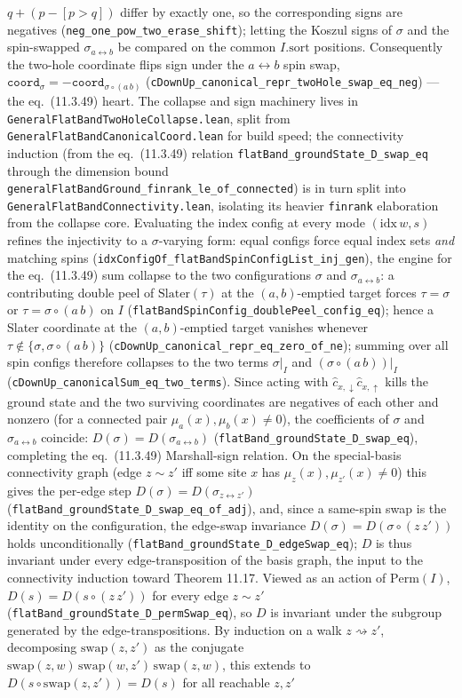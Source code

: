 \documentclass[a4paper,11pt]{article}
\begin{document}
$q+(p-[p>q])$ differ by exactly one, so the corresponding signs are negatives (\texttt{neg\_one\_pow\_two\_erase\_shift}); letting the Koszul signs of $\sigma$ and the spin-swapped $\sigma_{a\leftrightarrow b}$ be compared on the common $I.\mathrm{sort}$ positions.  Consequently the two-hole coordinate flips sign under the $a\leftrightarrow b$ spin swap, $\texttt{coord}_\sigma=-\texttt{coord}_{\sigma\circ(a\,b)}$ (\texttt{cDownUp\_canonical\_repr\_twoHole\_swap\_eq\_neg}) --- the eq.~(11.3.49) heart.  The collapse and sign machinery lives in \texttt{GeneralFlatBandTwoHoleCollapse.lean}, split from \texttt{GeneralFlatBandCanonicalCoord.lean} for build speed; the connectivity induction (from the eq.~(11.3.49) relation \texttt{flatBand\_groundState\_D\_swap\_eq} through the dimension bound \texttt{generalFlatBandGround\_finrank\_le\_of\_connected}) is in turn split into \texttt{GeneralFlatBandConnectivity.lean}, isolating its heavier \texttt{finrank} elaboration from the collapse core.  Evaluating the index config at every mode $(\mathrm{idx}\,w,s)$ refines the injectivity to a $\sigma$-varying form: equal configs force equal index sets \emph{and} matching spins (\texttt{idxConfigOf\_flatBandSpinConfigList\_inj\_gen}), the engine for the eq.~(11.3.49) sum collapse to the two configurations $\sigma$ and $\sigma_{a\leftrightarrow b}$: a contributing double peel of $\mathrm{Slater}(\tau)$ at the $(a,b)$-emptied target forces $\tau=\sigma$ or $\tau=\sigma\circ(a\,b)$ on $I$ (\texttt{flatBandSpinConfig\_doublePeel\_config\_eq}); hence a Slater coordinate at the $(a,b)$-emptied target vanishes whenever $\tau\notin\{\sigma,\sigma\circ(a\,b)\}$ (\texttt{cDownUp\_canonical\_repr\_eq\_zero\_of\_ne}); summing over all spin configs therefore collapses to the two terms $\sigma|_I$ and $(\sigma\circ(a\,b))|_I$ (\texttt{cDownUp\_canonicalSum\_eq\_two\_terms}).  Since acting with $\hat c_{x,\downarrow}\hat c_{x,\uparrow}$ kills the ground state and the two surviving coordinates are negatives of each other and nonzero (for a connected pair $\mu_a(x),\mu_b(x)\neq0$), the coefficients of $\sigma$ and $\sigma_{a\leftrightarrow b}$ coincide: $D(\sigma)=D(\sigma_{a\leftrightarrow b})$ (\texttt{flatBand\_groundState\_D\_swap\_eq}), completing the eq.~(11.3.49) Marshall-sign relation.  On the special-basis connectivity graph (edge $z\sim z'$ iff some site $x$ has $\mu_z(x),\mu_{z'}(x)\neq0$) this gives the per-edge step $D(\sigma)=D(\sigma_{z\leftrightarrow z'})$ (\texttt{flatBand\_groundState\_D\_swap\_eq\_of\_adj}), and, since a same-spin swap is the identity on the configuration, the edge-swap invariance $D(\sigma)=D(\sigma\circ(z\,z'))$ holds unconditionally (\texttt{flatBand\_groundState\_D\_edgeSwap\_eq}); $D$ is thus invariant under every edge-transposition of the basis graph, the input to the connectivity induction toward Theorem 11.17.  Viewed as an action of $\mathrm{Perm}(I)$, $D(s)=D(s\circ(z\,z'))$ for every edge $z\sim z'$ (\texttt{flatBand\_groundState\_D\_permSwap\_eq}), so $D$ is invariant under the subgroup generated by the edge-transpositions.  By induction on a walk $z\rightsquigarrow z'$, decomposing $\mathrm{swap}(z,z')$ as the conjugate $\mathrm{swap}(z,w)\,\mathrm{swap}(w,z')\,\mathrm{swap}(z,w)$, this extends to $D(s\circ\mathrm{swap}(z,z'))=D(s)$ for all reachable $z,z'$ 
\end{document}
